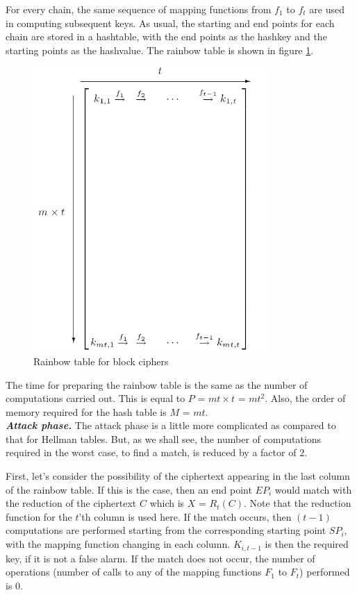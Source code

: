 For every chain, the same sequence of mapping functions from $f_1$ to $f_t$ are used in computing subsequent keys. As usual, the starting and end points for each chain are stored in a hashtable, with the end points as the hashkey and the starting points as the hashvalue. The rainbow table is shown in figure \ref{fig:rainbow-table}.

\begin{figure}[ht!]
	\centering
		\includegraphics[width=3.5in]{./figures/rainbow-table.PNG}
	\caption{Rainbow table for block ciphers}	
	\label{fig:rainbow-table}
\end{figure}

The time for preparing the rainbow table is the same as the number of computations carried out. This is equal to $P$ = $mt \times t$ = $mt^2$. Also, the order of memory required for the hash table is $M$ = $mt$. \\

\noindent \textit{\textbf{Attack phase.}} The attack phase is a little more complicated as compared to that for Hellman tables. But, as we shall see, the number of computations required in the worst case, to find a match, is reduced by a factor of $2$. 

First, let's consider the possibility of the ciphertext appearing in the last column of the rainbow table. If this is the case, then an end point $EP_i$ would match with the reduction of the ciphertext $C$ which is $X$ = $R_t(C)$. Note that the reduction function for the $t$'th column is used here. If the match occurs, then $(t-1)$ computations are performed starting from the corresponding starting point $SP_i$, with the mapping function changing in each column. $K_{i,t-1}$ is then the required key, if it is not a false alarm. If the match does not occur, the number of operations (number of calls to any of the mapping functions $F_1$ to $F_t$) performed is $0$. 

